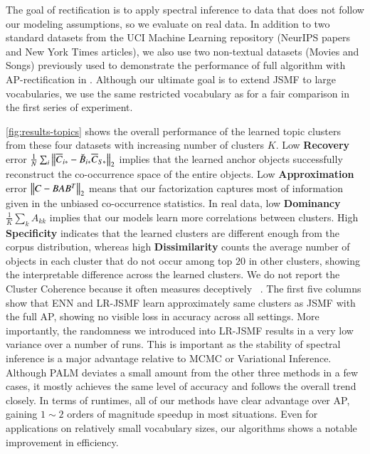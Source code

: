 The goal of rectification is to apply spectral inference to data that does not
follow our modeling assumptions, so we evaluate on real data. In addition to two
standard datasets from the UCI Machine Learning repository (NeurIPS papers and
New York Times articles), we also use two non\hyp{}textual datasets (Movies and
Songs) previously used to demonstrate the performance of full algorithm with
AP-rectification in \cite{moontae2015nips}. Although our ultimate goal is to
extend JSMF to large vocabularies, we use the same restricted vocabulary as 
\cite{moontae2015nips} for a fair comparison in the first series of experiment.

\cref{fig:results-topics} shows the overall performance of the learned topic
clusters from these four datasets with increasing number of clusters $K$. Low 
\textbf{Recovery} error $\frac{1}{N}\sum_i\left\lVert\overline{C}_{i\ast} - \breve{B}_{i\ast}
\overline{C}_{S\ast}\right\rVert_2$ implies that the learned anchor objects successfully
reconstruct the co\hyp{}occurrence space of the entire objects. Low 
\textbf{Approximation} error $\left\lVert C-BAB^T\right\rVert_2$ means that our factorization
captures most of information given in the unbiased co\hyp{}occurrence
statistics. In real data, low \textbf{Dominancy} $\frac{1}{K}\sum_k A_{kk}$
implies that our models learn more correlations between clusters. High 
\textbf{Specificity}  indicates that the learned clusters are different enough from the
corpus distribution, whereas high \textbf{Dissimilarity} counts the average
number of objects in each cluster that do not occur among top $20$ in other
clusters, showing the interpretable difference across the learned clusters. We
do not report the Cluster Coherence because it often measures deceptively~
\cite{chang2009reading}. The first five columns show that ENN and LR\hyp{}JSMF
learn approximately same clusters as JSMF with the full AP, showing no visible
loss in accuracy across all settings. More importantly, the randomness we
introduced into LR\hyp{}JSMF results in a very low variance over a number of
runs. This is important as the stability of spectral inference is a major
advantage relative to MCMC or Variational Inference. Although PALM deviates a
small amount from the other three methods in a few cases, it mostly achieves the
same level of accuracy and follows the overall trend closely. In terms of
runtimes, all of our methods have clear advantage over AP, gaining $1\sim2$
orders of magnitude speedup in most situations. Even for applications on
relatively small vocabulary sizes, our algorithms shows a notable improvement in
efficiency.

